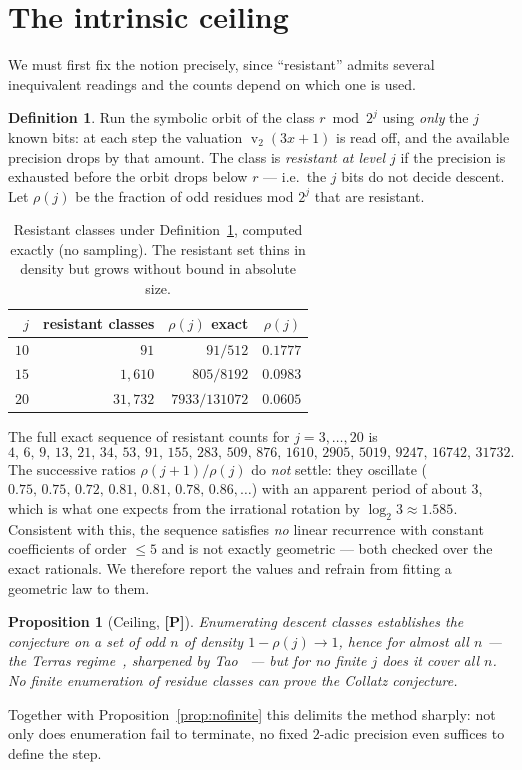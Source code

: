 \documentclass[11pt,a4paper]{article}
\theoremstyle{plain}
\newtheorem{proposition}[theorem]{Proposition}
\theoremstyle{definition}
\newtheorem{definition}[theorem]{Definition}
\newcommand{\val}{\operatorname{v}_2}
\begin{document}
\section{The intrinsic ceiling}
We must first fix the notion precisely, since ``resistant'' admits several inequivalent
readings and the counts depend on which one is used.

\begin{definition}\label{def:resist}
Run the symbolic orbit of the class $r\bmod 2^{j}$ using \emph{only} the $j$ known bits: at
each step the valuation $\val(3x+1)$ is read off, and the available precision drops by that
amount. The class is \emph{resistant at level $j$} if the precision is exhausted before the
orbit drops below $r$ --- i.e.\ the $j$ bits do not decide descent. Let $\rho(j)$ be the
fraction of odd residues mod $2^{j}$ that are resistant.
\end{definition}

\begin{table}[ht]\centering
\begin{tabular}{r r r r}
\toprule
$j$ & resistant classes & $\rho(j)$ exact & $\rho(j)$\\\midrule
$10$ & $91$       & $91/512$        & $0.1777$\\
$15$ & $1{,}610$  & $805/8192$      & $0.0983$\\
$20$ & $31{,}732$ & $7933/131072$   & $0.0605$\\
\bottomrule
\end{tabular}
\caption{Resistant classes under Definition~\ref{def:resist}, computed exactly (no
sampling). The resistant set thins in density but grows without bound in absolute size.}
\end{table}

\noindent The full exact sequence of resistant counts for $j=3,\dots,20$ is
\[
  4,\,6,\,9,\,13,\,21,\,34,\,53,\,91,\,155,\,283,\,509,\,876,\,1610,\,2905,\,5019,\,9247,
  \,16742,\,31732 .
\]
The successive ratios $\rho(j{+}1)/\rho(j)$ do \emph{not} settle: they oscillate
($0.75,\,0.75,\,0.72,\,0.81,\,0.81,\,0.78,\,0.86,\dots$) with an apparent period of about $3$,
which is what one expects from the irrational rotation by $\log_{2}3\approx1.585$. Consistent
with this, the sequence satisfies \emph{no} linear recurrence with constant coefficients of
order $\le5$ and is not exactly geometric --- both checked over the exact rationals. We
therefore report the values and refrain from fitting a geometric law to them.

\begin{proposition}[Ceiling, {\bf[P]}]
Enumerating descent classes establishes the conjecture on a set of odd $n$ of density
$1-\rho(j)\to1$, hence for \emph{almost all} $n$ --- the Terras regime~\cite{terras},
sharpened by Tao~\cite{tao} --- but for no finite $j$ does it cover all $n$. No finite
enumeration of residue classes can prove the Collatz conjecture.
\end{proposition}
\noindent Together with Proposition~\ref{prop:nofinite} this delimits the method sharply: not
only does enumeration fail to terminate, no fixed $2$-adic precision even suffices to define
the step.
\end{document}
